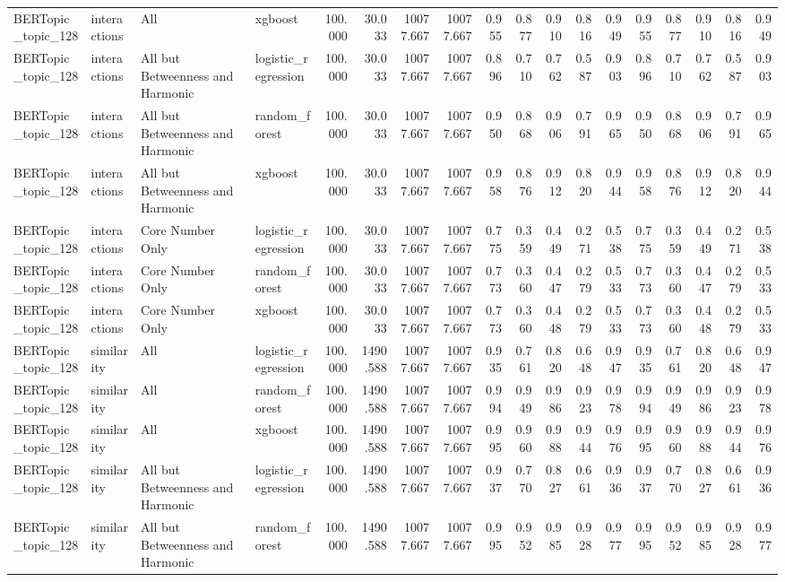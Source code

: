 \begin{tabular}{llllrrrrrrrrrrrrrr}
BERTopic_topic_128 & interactions & All & xgboost & 100.000 & 30.033 & 10077.667 & 10077.667 & 0.955 & 0.877 & 0.910 & 0.816 & 0.949 & 0.955 & 0.877 & 0.910 & 0.816 & 0.949 \\
BERTopic_topic_128 & interactions & All but Betweenness and Harmonic & logistic_regression & 100.000 & 30.033 & 10077.667 & 10077.667 & 0.896 & 0.710 & 0.762 & 0.587 & 0.903 & 0.896 & 0.710 & 0.762 & 0.587 & 0.903 \\
BERTopic_topic_128 & interactions & All but Betweenness and Harmonic & random_forest & 100.000 & 30.033 & 10077.667 & 10077.667 & 0.950 & 0.868 & 0.906 & 0.791 & 0.965 & 0.950 & 0.868 & 0.906 & 0.791 & 0.965 \\
BERTopic_topic_128 & interactions & All but Betweenness and Harmonic & xgboost & 100.000 & 30.033 & 10077.667 & 10077.667 & 0.958 & 0.876 & 0.912 & 0.820 & 0.944 & 0.958 & 0.876 & 0.912 & 0.820 & 0.944 \\
BERTopic_topic_128 & interactions & Core Number Only & logistic_regression & 100.000 & 30.033 & 10077.667 & 10077.667 & 0.775 & 0.359 & 0.449 & 0.271 & 0.538 & 0.775 & 0.359 & 0.449 & 0.271 & 0.538 \\
BERTopic_topic_128 & interactions & Core Number Only & random_forest & 100.000 & 30.033 & 10077.667 & 10077.667 & 0.773 & 0.360 & 0.447 & 0.279 & 0.533 & 0.773 & 0.360 & 0.447 & 0.279 & 0.533 \\
BERTopic_topic_128 & interactions & Core Number Only & xgboost & 100.000 & 30.033 & 10077.667 & 10077.667 & 0.773 & 0.360 & 0.448 & 0.279 & 0.533 & 0.773 & 0.360 & 0.448 & 0.279 & 0.533 \\
BERTopic_topic_128 & similarity & All & logistic_regression & 100.000 & 1490.588 & 10077.667 & 10077.667 & 0.935 & 0.761 & 0.820 & 0.648 & 0.947 & 0.935 & 0.761 & 0.820 & 0.648 & 0.947 \\
BERTopic_topic_128 & similarity & All & random_forest & 100.000 & 1490.588 & 10077.667 & 10077.667 & 0.994 & 0.949 & 0.986 & 0.923 & 0.978 & 0.994 & 0.949 & 0.986 & 0.923 & 0.978 \\
BERTopic_topic_128 & similarity & All & xgboost & 100.000 & 1490.588 & 10077.667 & 10077.667 & 0.995 & 0.960 & 0.988 & 0.944 & 0.976 & 0.995 & 0.960 & 0.988 & 0.944 & 0.976 \\
BERTopic_topic_128 & similarity & All but Betweenness and Harmonic & logistic_regression & 100.000 & 1490.588 & 10077.667 & 10077.667 & 0.937 & 0.770 & 0.827 & 0.661 & 0.936 & 0.937 & 0.770 & 0.827 & 0.661 & 0.936 \\
BERTopic_topic_128 & similarity & All but Betweenness and Harmonic & random_forest & 100.000 & 1490.588 & 10077.667 & 10077.667 & 0.995 & 0.952 & 0.985 & 0.928 & 0.977 & 0.995 & 0.952 & 0.985 & 0.928 & 0.977 \\

\end{tabular}
